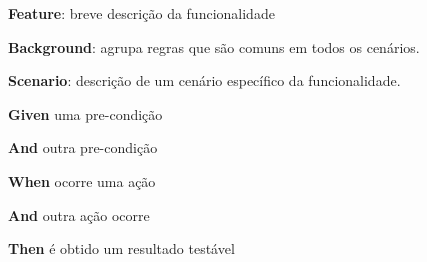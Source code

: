\textbf{Feature}: breve descrição da funcionalidade

\textbf{Background}: agrupa regras que são comuns em todos os cenários.

\textbf{Scenario}: descrição de um cenário específico da funcionalidade.

\hspace{1cm}\textbf{Given} uma pre-condição

\hspace{1cm}\textbf{And} outra pre-condição

\hspace{1cm}\textbf{When} ocorre uma ação

\hspace{1cm}\textbf{And} outra ação ocorre

\hspace{1cm}\textbf{Then} é obtido um resultado testável

